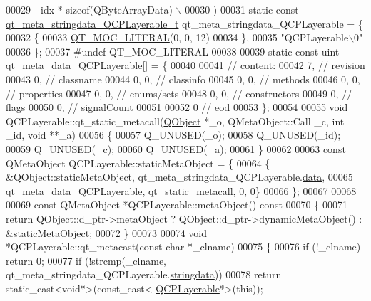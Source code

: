 \begin{DoxyCode}
00029 \textcolor{preprocessor}{        - idx * sizeof(QByteArrayData) \(\backslash\)}
00030 \textcolor{preprocessor}{    )}
00031 \textcolor{keyword}{static} \textcolor{keyword}{const} \hyperlink{a00067_de/dd2/a00207}{qt\_meta\_stringdata\_QCPLayerable\_t} 
      qt\_meta\_stringdata\_QCPLayerable = \{
00032     \{
00033 \hyperlink{a00067_a75bb9482d242cde0a06c9dbdc6b83abe}{QT\_MOC\_LITERAL}(0, 0, 12)
00034     \},
00035     \textcolor{stringliteral}{"QCPLayerable\(\backslash\)0"}
00036 \};
00037 \textcolor{preprocessor}{#undef QT\_MOC\_LITERAL}
00038 
00039 \textcolor{keyword}{static} \textcolor{keyword}{const} uint qt\_meta\_data\_QCPLayerable[] = \{
00040 
00041  \textcolor{comment}{// content:}
00042        7,       \textcolor{comment}{// revision}
00043        0,       \textcolor{comment}{// classname}
00044        0,    0, \textcolor{comment}{// classinfo}
00045        0,    0, \textcolor{comment}{// methods}
00046        0,    0, \textcolor{comment}{// properties}
00047        0,    0, \textcolor{comment}{// enums/sets}
00048        0,    0, \textcolor{comment}{// constructors}
00049        0,       \textcolor{comment}{// flags}
00050        0,       \textcolor{comment}{// signalCount}
00051 
00052        0        \textcolor{comment}{// eod}
00053 \};
00054 
00055 \textcolor{keywordtype}{void} QCPLayerable::qt\_static\_metacall(\hyperlink{a00059}{QObject} *\_o, QMetaObject::Call \_c, \textcolor{keywordtype}{int} \_id, \textcolor{keywordtype}{void} **\_a)
00056 \{
00057     Q\_UNUSED(\_o);
00058     Q\_UNUSED(\_id);
00059     Q\_UNUSED(\_c);
00060     Q\_UNUSED(\_a);
00061 \}
00062 
00063 \textcolor{keyword}{const} QMetaObject QCPLayerable::staticMetaObject = \{
00064     \{ &QObject::staticMetaObject, qt\_meta\_stringdata\_QCPLayerable.\hyperlink{a00067_a08a4a1de23442a83952a11d68453ab4d}{data},
00065       qt\_meta\_data\_QCPLayerable,  qt\_static\_metacall, 0, 0\}
00066 \};
00067 
00068 
00069 \textcolor{keyword}{const} QMetaObject *QCPLayerable::metaObject()\textcolor{keyword}{ const}
00070 \textcolor{keyword}{}\{
00071     \textcolor{keywordflow}{return} QObject::d\_ptr->metaObject ? QObject::d\_ptr->dynamicMetaObject() : &staticMetaObject;
00072 \}
00073 
00074 \textcolor{keywordtype}{void} *QCPLayerable::qt\_metacast(\textcolor{keyword}{const} \textcolor{keywordtype}{char} *\_clname)
00075 \{
00076     \textcolor{keywordflow}{if} (!\_clname) \textcolor{keywordflow}{return} 0;
00077     \textcolor{keywordflow}{if} (!strcmp(\_clname, qt\_meta\_stringdata\_QCPLayerable.\hyperlink{a00067_a4dff397c178a0aa24e1087e6ab89c187}{stringdata}))
00078         \textcolor{keywordflow}{return} \textcolor{keyword}{static\_cast<}\textcolor{keywordtype}{void}*\textcolor{keyword}{>}(\textcolor{keyword}{const\_cast<} \hyperlink{a00044}{QCPLayerable}*\textcolor{keyword}{>}(\textcolor{keyword}{this}));

\end{DoxyCode}
